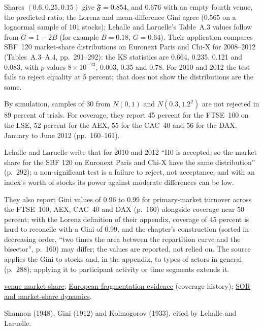 \begin{qfmethod}
 Shares $(0.6,0.25,0.15)$ give $\mathfrak F=0.854$, and $0.676$ with an empty fourth venue, the predicted ratio; the Lorenz and mean-difference Gini agree (0.565 on a lognormal sample of 101 stocks); Lehalle and Laruelle's Table~A.3 values follow from $G=1-2B$ (for example $B=0.18$, $G=0.64$). Their application compares SBF~120 market-share distributions on Euronext Paris and Chi-X for 2008--2012 (Tables~A.3--A.4, pp.~291--292): the KS statistics are 0.664, 0.235, 0.121 and 0.083, with $p$-values $8\times10^{-23}$, 0.003, 0.35 and 0.78. For 2010 and 2012 the test fails to reject equality at 5 percent; that does not show the distributions are the same.

By simulation, samples of 30 from $N(0,1)$ and $N(0.3,1.2^2)$ are not rejected in 89 percent of trials. For coverage, they report 45 percent for the FTSE~100 on the LSE, 52 percent for the AEX, 55 for the CAC~40 and 56 for the DAX, January to June 2012 (pp.~160--161).

 Lehalle and Laruelle write that for 2010 and 2012 ``H0 is accepted, so the market share for the SBF 120 on Euronext Paris and Chi-X have the same distribution'' (p.~292); a non-significant test is a failure to reject, not acceptance, and with an index's worth of stocks its power against moderate differences can be low.

They also report Gini values of 0.96 to 0.99 for primary-market turnover across the FTSE~100, AEX, CAC~40 and DAX (p.~160) alongside coverage near 50 percent; with the Lorenz definition of their appendix, coverage of 45 percent is hard to reconcile with a Gini of 0.99, and the chapter's construction (sorted in decreasing order, ``two times the area between the repartition curve and the bisector'', p.~160) may differ; the values are reported, not relied on. The source applies the Gini to stocks and, in the appendix, to types of actors in general (p.~288); applying it to participant activity or time segments extends it.

 \hyperref[meth:venue-market-share]{venue market share}; \hyperref[ev:european-fragmentation-evidence]{European fragmentation evidence} (coverage history); \hyperref[mod:sor-market-share-dynamics]{SOR and market-share dynamics}.

 Shannon (1948), Gini (1912) and Kolmogorov (1933), cited by Lehalle and Laruelle.

\end{qfmethod}


